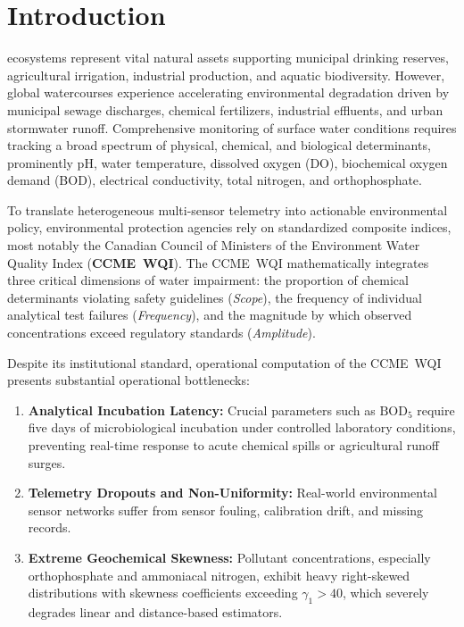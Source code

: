 \documentclass[conference]{IEEEtran}
\begin{document}
\section{Introduction}
\label{sec:intro}

 ecosystems represent vital natural assets supporting municipal drinking reserves, agricultural irrigation, industrial production, and aquatic biodiversity. However, global watercourses experience accelerating environmental degradation driven by municipal sewage discharges, chemical fertilizers, industrial effluents, and urban stormwater runoff. Comprehensive monitoring of surface water conditions requires tracking a broad spectrum of physical, chemical, and biological determinants, prominently pH, water temperature, dissolved oxygen (DO), biochemical oxygen demand (BOD), electrical conductivity, total nitrogen, and orthophosphate.

To translate heterogeneous multi-sensor telemetry into actionable environmental policy, environmental protection agencies rely on standardized composite indices, most notably the Canadian Council of Ministers of the Environment Water Quality Index (\textbf{CCME~WQI}). The CCME~WQI mathematically integrates three critical dimensions of water impairment: the proportion of chemical determinants violating safety guidelines (\emph{Scope}), the frequency of individual analytical test failures (\emph{Frequency}), and the magnitude by which observed concentrations exceed regulatory standards (\emph{Amplitude}).

Despite its institutional standard, operational computation of the CCME~WQI presents substantial operational bottlenecks:
\begin{enumerate}
  \item \textbf{Analytical Incubation Latency:} Crucial parameters such as $\text{BOD}_5$ require five days of microbiological incubation under controlled laboratory conditions, preventing real-time response to acute chemical spills or agricultural runoff surges.
  \item \textbf{Telemetry Dropouts and Non-Uniformity:} Real-world environmental sensor networks suffer from sensor fouling, calibration drift, and missing records.
  \item \textbf{Extreme Geochemical Skewness:} Pollutant concentrations, especially orthophosphate and ammoniacal nitrogen, exhibit heavy right-skewed distributions with skewness coefficients exceeding $\gamma_1 > 40$, which severely degrades linear and distance-based estimators.
\end{enumerate}
\end{document}
